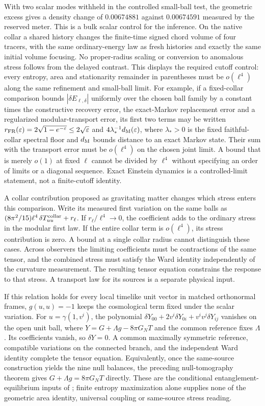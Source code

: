 \documentclass[11pt]{article}
\begin{document}
With two scalar modes withheld in the controlled small-ball test,
the geometric excess gives a density change of $0.00674881$ against
$0.00674591$ measured by the reserved meter. This is a bulk scalar
control for the inference. On the native collar a shared history
changes the finite-time signed chord volume of four tracers, with
the same ordinary-energy law as fresh histories and exactly the
same initial volume focusing. No proper-radius scaling or conversion
to anomalous stress follows from the delayed contrast.
This displays the required cutoff control: every entropy, area and
stationarity remainder in parentheses must be $o(\ell^4)$ along the same
refinement and small-ball limit. For example, if a fixed-collar comparison
bounds $|\delta E_{\ell,\delta}|$ uniformly over the chosen ball family by
a constant times the constructive
recovery error, the exact-Markov replacement error and a regularized
modular-transport error, its first two terms may be written
$r_{\rm FR}(\varepsilon)=2\sqrt{1-e^{-\varepsilon}}\leq2\sqrt\varepsilon$
and $4\lambda_*^{-1}d_{\rm M}(\varepsilon)$, where $\lambda_*>0$ is the
fixed faithful-collar spectral floor and $d_{\rm M}$ bounds distance to an
exact Markov state. Their sum with the transport error must be
$o(\ell^4)$ on the chosen
joint limit. A bound that is merely $o(1)$ at fixed $\ell$ cannot be
divided by $\ell^4$ without specifying an order of limits or a diagonal
sequence. Exact Einstein dynamics is a controlled-limit statement, not a
finite-cutoff identity.

A collar contribution proposed as gravitating matter changes which stress
enters this comparison. Write its measured first variation on the same
balls as $(8\pi^2/15)\ell^4\,\delta T^{\rm collar}_{uu}+r_\ell$.
If $r_\ell/\ell^4\to0$, the coefficient adds to the ordinary stress
in the modular first law. If the entire collar term is $o(\ell^4)$,
its stress contribution is zero. A bound at a single collar radius
cannot distinguish these cases. Across observers the limiting
coefficients must be contractions of the same tensor, and the
combined stress must satisfy the Ward identity independently of the
curvature measurement. The resulting tensor equation constrains the
response to that stress. A transport law for its sources is a separate
physical input.

If this relation holds for every local timelike unit vector in matched
orthonormal frames, $g(u,u)=-1$ keeps the cosmological term fixed under the
scalar variation. For $u=\gamma(1,v^i)$, the polynomial
$\delta Y_{00}+2v^i\delta Y_{0i}+v^iv^j\delta Y_{ij}$ vanishes on the open
unit ball, where $Y=G+\Lambda g-8\pi G_N T$ and the common reference fixes
$\Lambda$. Its coefficients vanish, so $\delta Y=0$. A common maximally
symmetric reference, compatible variations on the connected branch, and
the independent Ward identity complete the tensor equation. Equivalently,
once the same-source construction yields the nine null balances, the
preceding null-tomography theorem gives $G+\Lambda g=8\pi G_N T$
directly. These are the conditional entanglement-equilibrium inputs of
\cite{jacobson16}; finite entropy maximization alone supplies none of the
geometric area identity, universal coupling or same-source stress reading.
\end{document}
